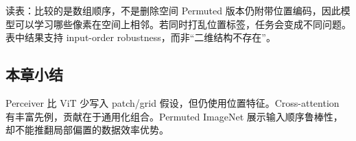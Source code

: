 \begin{knowledgebox}{读表：比较的是数组顺序，不是删除空间}
Permuted 版本仍附带位置编码，因此模型可以学习哪些像素在空间上相邻。若同时打乱位置标签，任务会变成不同问题。表中结果支持 input-order robustness，而非“二维结构不存在”。
\end{knowledgebox}


\subsection{本章小结}

Perceiver 比 ViT 少写入 patch/grid 假设，但仍使用位置特征。Cross-attention 有丰富先例，贡献在于通用化组合。Permuted ImageNet 展示输入顺序鲁棒性，却不能推翻局部偏置的数据效率优势。

